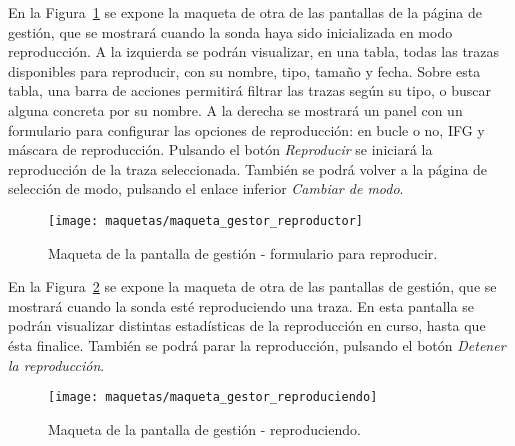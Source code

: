 En la Figura~\ref{fig:maqueta:gestor_reproductor} se expone la maqueta de otra de las pantallas de la página de gestión, que se mostrará cuando la sonda haya sido inicializada en modo reproducción.
A la izquierda se podrán visualizar, en una tabla, todas las \glspl{traza} disponibles para reproducir, con su nombre, tipo, tamaño y fecha.
Sobre esta tabla, una barra de acciones permitirá filtrar las \glspl{traza} según su tipo, o buscar alguna concreta por su nombre.
A la derecha se mostrará un panel con un formulario para configurar las opciones de reproducción: en bucle o no, \gls{IFG} y máscara de reproducción.
Pulsando el botón \textit{Reproducir} se iniciará la reproducción de la traza seleccionada.
También se podrá volver a la página de selección de modo, pulsando el enlace inferior \textit{Cambiar de modo}.
\begin{figure}[!htp]
  \centering
  \texttt{[image: maquetas/maqueta\_gestor\_reproductor]}
  \caption{Maqueta de la pantalla de gestión - formulario para reproducir.}
  \label{fig:maqueta:gestor_reproductor}
\end{figure}
\clearpage

En la Figura~\ref{fig:maqueta:gestor_reproduciendo} se expone la maqueta de otra de las pantallas de gestión, que se mostrará cuando la sonda esté reproduciendo una \gls{traza}.
En esta pantalla se podrán visualizar distintas estadísticas de la reproducción en curso, hasta que ésta finalice.
También se podrá parar la reproducción, pulsando el botón \textit{Detener la reproducción}.
\begin{figure}[!htp]
  \centering
  \texttt{[image: maquetas/maqueta\_gestor\_reproduciendo]}
  \caption{Maqueta de la pantalla de gestión - reproduciendo.}
  \label{fig:maqueta:gestor_reproduciendo}
\end{figure}
